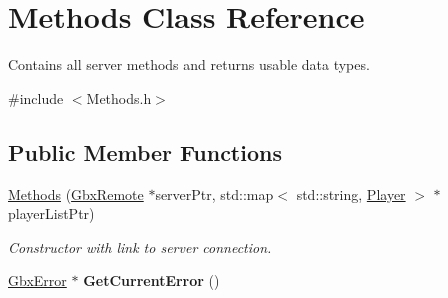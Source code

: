 \hypertarget{classMethods}{\section{Methods Class Reference}
\label{classMethods}
}


Contains all server methods and returns usable data types.  




{\ttfamily \#include $<$Methods.\-h$>$}

\subsection*{Public Member Functions}
\begin{DoxyCompactItemize}
\item 
\hyperlink{classMethods_a6a1eff4e430d47fefa63b0d71a3cc99d}{Methods} (\hyperlink{classGbxRemote}{Gbx\-Remote} $\ast$server\-Ptr, std\-::map$<$ std\-::string, \hyperlink{structPlayer}{Player} $>$ $\ast$player\-List\-Ptr)
\begin{DoxyCompactList}\small\item\em Constructor with link to server connection. \end{DoxyCompactList}\item 
\hypertarget{classMethods_a9110ac8e4a4615028aca6fffad10bdef}{\hyperlink{structGbxError}{Gbx\-Error} $\ast$ {\bfseries Get\-Current\-Error} ()}\label{classMethods_a9110ac8e4a4615028aca6fffad10bdef}


\end{DoxyCompactItemize}
